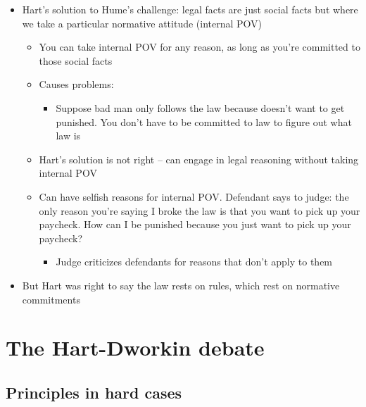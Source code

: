 \begin{itemize}
\tightlist
\item
  Hart's solution to Hume's challenge: legal facts are just social facts
  but where we take a particular normative attitude (internal POV)

  \begin{itemize}
  \tightlist
  \item
    You can take internal POV for any reason, as long as you're
    committed to those social facts
  \item
    Causes problems:

    \begin{itemize}
    \tightlist
    \item
      Suppose bad man only follows the law because doesn't want to get
      punished. You don't have to be committed to law to figure out what
      law is
    \end{itemize}
  \item
    Hart's solution is not right -- can engage in legal reasoning
    without taking internal POV
  \item
    Can have selfish reasons for internal POV. Defendant says to judge:
    the only reason you're saying I broke the law is that you want to
    pick up your paycheck. How can I be punished because you just want
    to pick up your paycheck?

    \begin{itemize}
    \tightlist
    \item
      Judge criticizes defendants for reasons that don't apply to them
    \end{itemize}
  \end{itemize}
\item
  But Hart was right to say the law rests on rules, which rest on
  normative commitments
\end{itemize}

\hypertarget{the-hart-dworkin-debate}{%
\section{The Hart-Dworkin debate}\label{the-hart-dworkin-debate}}

\hypertarget{principles-in-hard-cases}{%
\subsection{Principles in hard cases}\label{principles-in-hard-cases}}


